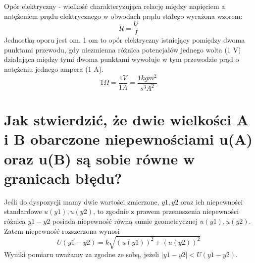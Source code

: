 \documentclass[a4paper,11pt]{article} %
\begin{document}
Opór elektryczny - wielkość charakteryzująca relację między napięciem a natężeniem prądu elektrycznego w obwodach prądu stałego wyrażona wzorem: 
$$R = \frac{U}{I}$$
Jednostką oporu jest om. 1 om to opór elektryczny istniejący pomiędzy dwoma punktami przewodu, gdy niezmienna różnica potencjałów jednego wolta (1 V) działająca między tymi dwoma punktami wywołuje w tym przewodzie prąd o natężeniu jednego ampera (1 A).
$$1 \Omega = \frac{1V}{1A} = \frac{1kgm^2}{s^3A^2}$$

\section{Jak stwierdzić, że dwie wielkości A i B obarczone niepewnościami u(A)
oraz u(B) są sobie równe w granicach błędu? }
Jeśli do dyspozycji mamy dwie wartości zmierzone, $y1, y2$ oraz ich niepewności standardowe $u(y1), u(y2)$, to zgodnie z prawem przenoszenia niepewności różnica $y1-y2$ posiada niepewność równą sumie geometrycznej $u(y1), u(y2)$. \\
Zatem niepewność rozszerzona wynosi
$$ U(y1-y2) = k\sqrt{(u(y1))^2 +(u(y2))^2}$$
Wyniki pomiaru uważamy za zgodne ze sobą, jeżeli $|y1-y2| < U(y1-y2)$.
\end{document}
